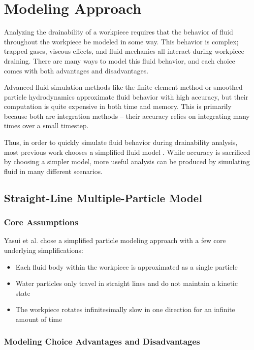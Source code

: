 						\chapter{Modeling Approach}

Analyzing the drainability of a workpiece requires that the behavior of fluid throughout the workpiece be modeled in some way. This behavior is complex; trapped gases, viscous effects, and fluid mechanics all interact during workpiece draining. There are many ways to model this fluid behavior, and each choice comes with both advantages and disadvantages.

Advanced fluid simulation methods like the finite element method or smoothed-particle hydrodynamics approximate fluid behavior with high accuracy, but their computation is quite expensive in both time and memory. This is primarily because both are integration methods -- their accuracy relies on integrating many times over a small timestep.

Thus, in order to quickly simulate fluid behavior during drainability analysis, most previous work chooses a  simplified fluid model \cite{Yasui2011}. While accuracy is sacrificed by choosing a simpler model, more useful analysis can be produced by simulating fluid in many different scenarios.

\section{Straight-Line Multiple-Particle Model}

	\subsection{Core Assumptions}

Yasui et al. \cite{Yasui2011} chose a simplified particle modeling approach with a few core underlying simplifications:

\begin{itemize}
	\item Each fluid body within the workpiece is approximated as a single particle
	\item Water particles only travel in straight lines and do not maintain a kinetic state
	\item The workpiece rotates infinitesimally slow in one direction for an infinite amount of time
\end{itemize}

	\subsection{Modeling Choice Advantages and Disadvantages}

